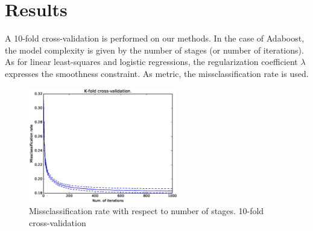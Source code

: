 \documentclass[10pt,conference,compsocconf]{IEEEtran}
\begin{document}
\section{Results}
\label{sec:orgheadline11}
A 10-fold cross-validation is performed on our methods. In the case of Adaboost, the model complexity is given by the number of stages (or number of iterations). As for linear least-squares and logistic regressions, the regularization coefficient \(\lambda\) expresses the smoothness constraint.
As metric, the missclassification rate is used.


\begin{figure}[htb]
\centering
\includegraphics[width=0.58\textwidth]{pics/ada_cv10.eps}
\caption{\label{fig:orgparagraph1}
Missclassification rate with respect to number of stages. 10-fold cross-validation}
\end{figure}




\printbibliography
\end{document}
